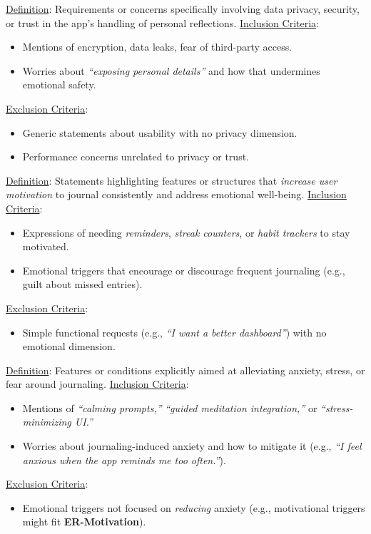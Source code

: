 \documentclass[acmsmall]{acmart}
\begin{document}
\begin{description}[leftmargin=1.2em,labelsep=0.6em]
\item[\textbf{ER-Privacy}] 
\underline{Definition}: Requirements or concerns specifically involving data privacy, security, or trust in the app’s handling of personal reflections.
\newline
\underline{Inclusion Criteria}:
\begin{itemize}
  \item Mentions of encryption, data leaks, fear of third-party access.
  \item Worries about \emph{“exposing personal details”} and how that undermines emotional safety.
\end{itemize}
\underline{Exclusion Criteria}:
\begin{itemize}
  \item Generic statements about usability with no privacy dimension.
  \item Performance concerns unrelated to privacy or trust.
\end{itemize}

\item[\textbf{ER-Motivation}]
\underline{Definition}: Statements highlighting features or structures that \emph{increase user motivation} to journal consistently and address emotional well-being.
\newline
\underline{Inclusion Criteria}:
\begin{itemize}
  \item Expressions of needing \emph{reminders}, \emph{streak counters}, or \emph{habit trackers} to stay motivated.
  \item Emotional triggers that encourage or discourage frequent journaling (e.g., guilt about missed entries).
\end{itemize}
\underline{Exclusion Criteria}:
\begin{itemize}
  \item Simple functional requests (e.g., \emph{“I want a better dashboard”}) with no emotional dimension.
\end{itemize}

\item[\textbf{ER-Anxiety\_Relief}]
\underline{Definition}: Features or conditions explicitly aimed at alleviating anxiety, stress, or fear around journaling.
\newline
\underline{Inclusion Criteria}:
\begin{itemize}
  \item Mentions of \emph{“calming prompts,”} \emph{“guided meditation integration,”} or \emph{“stress-minimizing UI.”}
  \item Worries about journaling-induced anxiety and how to mitigate it (e.g., \emph{“I feel anxious when the app reminds me too often.”}).
\end{itemize}
\underline{Exclusion Criteria}:
\begin{itemize}
  \item Emotional triggers not focused on \emph{reducing} anxiety (e.g., motivational triggers might fit \textbf{ER-Motivation}).
\end{itemize}
\end{description}
\end{document}
